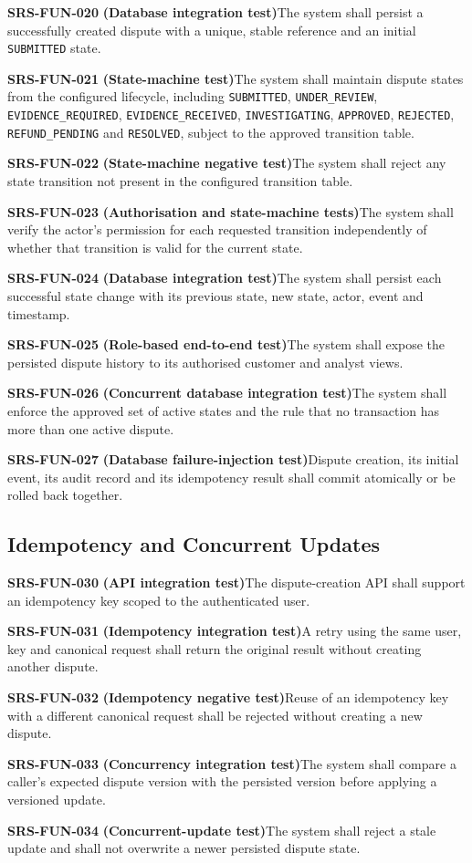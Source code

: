 \documentclass[11pt,a4paper]{article}
\newcommand{\req}[3]{%
    \par\noindent\textbf{\color{ADGBlue}#1}\quad
    \textbf{(#3)}\enspace #2\par\smallskip
}
\begin{document}
\req{SRS-FUN-020}{The system shall persist a successfully created dispute with a unique, stable reference and an initial \texttt{SUBMITTED} state.}{Database integration test}
\req{SRS-FUN-021}{The system shall maintain dispute states from the configured lifecycle, including \texttt{SUBMITTED}, \texttt{UNDER\_REVIEW}, \texttt{EVIDENCE\_REQUIRED}, \texttt{EVIDENCE\_RECEIVED}, \texttt{INVESTIGATING}, \texttt{APPROVED}, \texttt{REJECTED}, \texttt{REFUND\_PENDING} and \texttt{RESOLVED}, subject to the approved transition table.}{State-machine test}
\req{SRS-FUN-022}{The system shall reject any state transition not present in the configured transition table.}{State-machine negative test}
\req{SRS-FUN-023}{The system shall verify the actor's permission for each requested transition independently of whether that transition is valid for the current state.}{Authorisation and state-machine tests}
\req{SRS-FUN-024}{The system shall persist each successful state change with its previous state, new state, actor, event and timestamp.}{Database integration test}
\req{SRS-FUN-025}{The system shall expose the persisted dispute history to its authorised customer and analyst views.}{Role-based end-to-end test}
\req{SRS-FUN-026}{The system shall enforce the approved set of active states and the rule that no transaction has more than one active dispute.}{Concurrent database integration test}
\req{SRS-FUN-027}{Dispute creation, its initial event, its audit record and its idempotency result shall commit atomically or be rolled back together.}{Database failure-injection test}

\subsection{Idempotency and Concurrent Updates}

\req{SRS-FUN-030}{The dispute-creation API shall support an idempotency key scoped to the authenticated user.}{API integration test}
\req{SRS-FUN-031}{A retry using the same user, key and canonical request shall return the original result without creating another dispute.}{Idempotency integration test}
\req{SRS-FUN-032}{Reuse of an idempotency key with a different canonical request shall be rejected without creating a new dispute.}{Idempotency negative test}
\req{SRS-FUN-033}{The system shall compare a caller's expected dispute version with the persisted version before applying a versioned update.}{Concurrency integration test}
\req{SRS-FUN-034}{The system shall reject a stale update and shall not overwrite a newer persisted dispute state.}{Concurrent-update test}
\end{document}
